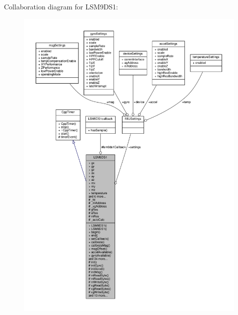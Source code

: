 Collaboration diagram for L\+S\+M9\+D\+S1\+:\nopagebreak
\begin{figure}[H]
\begin{center}
\leavevmode
\includegraphics[width=350pt]{classLSM9DS1__coll__graph}
\end{center}
\end{figure}
